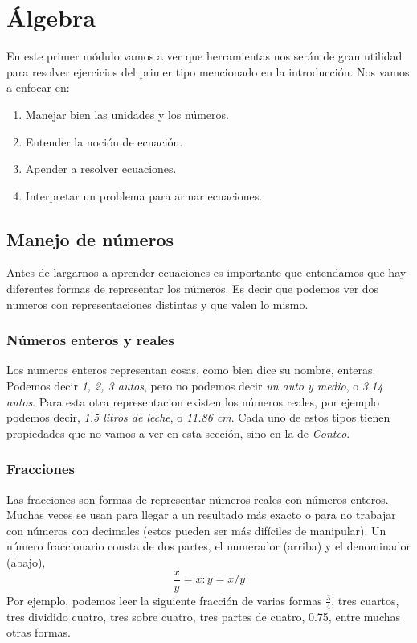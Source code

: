 \documentclass{article}
\begin{document}
\newpage

\section{Álgebra}
\begin{normalsize}
En este primer módulo vamos a ver que herramientas nos serán de gran utilidad para resolver ejercicios del primer tipo mencionado en la introducción.
Nos vamos a enfocar en:
\begin{enumerate}
	\item Manejar bien las unidades y los números.
	\item Entender la noción de ecuación.
	\item Apender a resolver ecuaciones.
	\item Interpretar un problema para armar ecuaciones.
\end{enumerate}
\end{normalsize}

\subsection{Manejo de números}
\begin{normalsize}
Antes de largarnos a aprender ecuaciones es importante que entendamos que hay diferentes formas de representar los números. Es decir que podemos ver dos numeros con representaciones distintas y que valen lo mismo.
\end{normalsize}

\subsubsection*{Números enteros y reales}
\begin{normalsize}
Los numeros enteros representan cosas, como bien dice su nombre, enteras. Podemos decir \textit{1, 2, 3 autos}, pero no podemos decir \textit{un auto y medio}, o \textit{3.14 autos}. Para esta otra representacion existen los números reales, por ejemplo podemos decir, \textit{1.5 litros de leche}, o \textit{11.86 cm}.
Cada uno de estos tipos tienen propiedades que no vamos a ver en esta sección, sino en la de \textit{Conteo}.
\end{normalsize}

\subsubsection*{Fracciones}
\begin{normalsize}
Las fracciones son formas de representar números reales con números enteros. Muchas veces se usan para llegar a un resultado más exacto o para no trabajar con números con decimales (estos pueden ser más difíciles de manipular). Un número fraccionario consta de dos partes, el numerador (arriba) y el denominador (abajo),
\[\frac{x}{y}=x:y=x/y\]
Por ejemplo, podemos leer la siguiente fracción de varias formas $\frac{3}{4}$, tres cuartos, tres dividido cuatro, tres sobre cuatro, tres partes de cuatro, 0.75, entre muchas otras formas.
\\
\end{normalsize}
\end{document}
